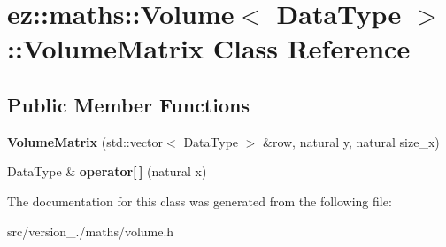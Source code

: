 \hypertarget{classez_1_1maths_1_1Volume_1_1VolumeMatrix}{}\section{ez\+:\+:maths\+:\+:Volume$<$ Data\+Type $>$\+:\+:Volume\+Matrix Class Reference}
\label{classez_1_1maths_1_1Volume_1_1VolumeMatrix}
\subsection*{Public Member Functions}
\begin{DoxyCompactItemize}
\item 
\mbox{\label{classez_1_1maths_1_1Volume_1_1VolumeMatrix_a0d20671d5bb8b80cabebabb046ffacb8}} 
{\bfseries Volume\+Matrix} (std\+::vector$<$ Data\+Type $>$ \&row, natural y, natural size\+\_\+x)
\item 
\mbox{\label{classez_1_1maths_1_1Volume_1_1VolumeMatrix_abdc86dc236f63a94ad9d90b855906b26}} 
Data\+Type \& {\bfseries operator\mbox{[}$\,$\mbox{]}} (natural x)
\end{DoxyCompactItemize}


The documentation for this class was generated from the following file\+:\begin{DoxyCompactItemize}
\item 
src/version\+\_./maths/volume.\+h\end{DoxyCompactItemize}
